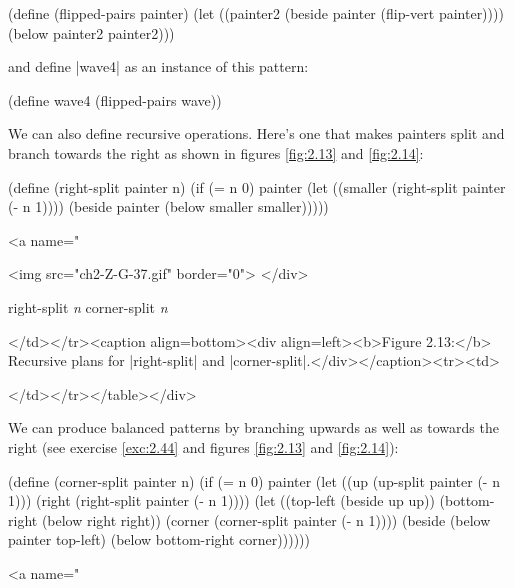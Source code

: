 \begin{Exercise}
\begin{Exercise}
\begin{Exercise}
\begin{schemedisplay}
(define (flipped-pairs painter)
  (let ((painter2 (beside painter (flip-vert painter))))
    (below painter2 painter2)))
\end{schemedisplay}
and define \scheme|wave4| as an instance of this pattern:


\begin{schemedisplay}
(define wave4 (flipped-pairs wave))
\end{schemedisplay}

We can also define recursive operations.
Here's one that makes painters split and branch
towards the right as shown in figures \ref{fig:2.13}
and  \ref{fig:2.14}:
\begin{schemedisplay}
(define (right-split painter n)
  (if (= n 0)
      painter
      (let ((smaller (right-split painter (- n 1))))
        (beside painter (below smaller smaller)))))
\end{schemedisplay}

<a name="%
                   
<img src="ch2-Z-G-37.gif" border="0"> </div>

\begin{schemedisplay}
     right-split \textit{n}                   corner-split \textit{n}
\end{schemedisplay}
</td></tr><caption align=bottom><div align=left><b>Figure 2.13:</b>  Recursive plans for \scheme|right-split| and \scheme|corner-split|.</div></caption><tr><td>

</td></tr></table></div> 

We can produce balanced patterns by branching upwards
as well as towards the right (see exercise \ref{exc:2.44}
and figures \ref{fig:2.13} and  \ref{fig:2.14}):

\begin{schemedisplay}
(define (corner-split painter n)
  (if (= n 0)
      painter
      (let ((up (up-split painter (- n 1)))
            (right (right-split painter (- n 1))))
        (let ((top-left (beside up up))
              (bottom-right (below right right))
              (corner (corner-split painter (- n 1))))
          (beside (below painter top-left)
                  (below bottom-right corner))))))
\end{schemedisplay}

<a name="%
          

\end{Exercise}
\end{Exercise}
\end{Exercise}
